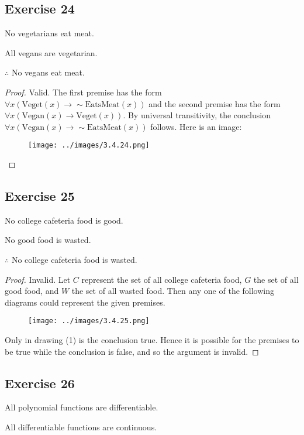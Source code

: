 \documentclass[14pt]{extarticle}
\newcommand{\fa}{\forall}
\begin{document}
\subsection{Exercise 24}
No vegetarians eat meat.

All vegans are vegetarian.

$\therefore$ No vegans eat meat.

\begin{proof}
    Valid. The first premise has the form $\fa x(\text{Veget}(x) \to \sim\text{EatsMeat}(x))$ and the second premise has the form $\fa x(\text{Vegan}(x) \to \text{Veget}(x))$. By universal transitivity, the conclusion $\fa x (\text{Vegan}(x) \to \sim\text{EatsMeat}(x))$ follows. Here is an image:

    \begin{figure}[ht!]
        \centering
        \texttt{[image: ../images/3.4.24.png]}
    \end{figure}
\end{proof}

\subsection{Exercise 25}
No college cafeteria food is good.

No good food is wasted.

$\therefore$ No college cafeteria food is wasted.

\begin{proof}
    Invalid. Let $C$ represent the set of all college cafeteria food, $G$ the set of all good food, and $W$ the set of all wasted food. Then any one of the following diagrams could represent the given premises.

    \begin{figure}[ht!]
        \centering
        \texttt{[image: ../images/3.4.25.png]}
    \end{figure}

    Only in drawing (1) is the conclusion true. Hence it is possible for the premises to be true while the conclusion is false, and so the argument is invalid.
\end{proof}

\subsection{Exercise 26}
All polynomial functions are differentiable.

All differentiable functions are continuous.
\end{document}
